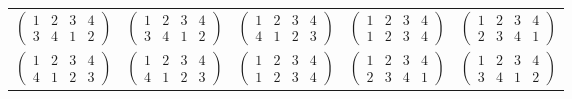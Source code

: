 \documentclass[titlepage]{article}
\newenvironment{problem}[2][Problem]{\begin{trivlist}
\item[\hskip \labelsep {\bfseries #1}\hskip \labelsep {\bfseries #2.}]}{\end{trivlist}}
\begin{document}
\begin{problem}{9}
\begin{itemize}
\begin{tabular}{c | c c c c}
    $\left(\begin{smallmatrix} 1 & 2 & 3 & 4 \\ 3 & 4 & 1 & 2\end{smallmatrix}\right)$& $\left(\begin{smallmatrix} 1 & 2 & 3 & 4 \\ 3 & 4 & 1 & 2\end{smallmatrix}\right)$ & $\left(\begin{smallmatrix} 1 & 2 & 3 & 4 \\ 4 & 1 & 2 & 3 \end{smallmatrix} \right)$ & $\left(\begin{smallmatrix} 1 & 2 & 3 & 4 \\ 1 & 2 & 3 & 4\end{smallmatrix} \right)$ &$\left(\begin{smallmatrix} 1 & 2 & 3 & 4 \\ 2 & 3 & 4 & 1\end{smallmatrix}\right)$\\
    $\left(\begin{smallmatrix} 1 & 2 & 3 & 4 \\ 4 & 1 & 2 & 3 \end{smallmatrix} \right)$ & $\left(\begin{smallmatrix} 1 & 2 & 3 & 4 \\ 4 & 1 & 2 & 3 \end{smallmatrix} \right)$ & $\left(\begin{smallmatrix} 1 & 2 & 3 & 4 \\ 1 & 2 & 3 & 4\end{smallmatrix} \right)$ & $\left(\begin{smallmatrix} 1 & 2 & 3 & 4 \\ 2 & 3 & 4 & 1\end{smallmatrix}\right)$ & $\left(\begin{smallmatrix} 1 & 2 & 3 & 4 \\ 3 & 4 & 1 & 2\end{smallmatrix}\right)$ \\
\end{tabular}


\end{itemize}
\end{problem}
\end{document}
